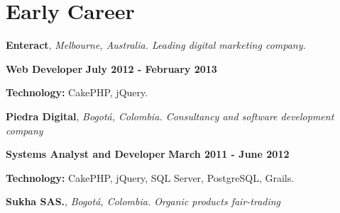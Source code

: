 
\section{Early Career}
%
\textbf{Enteract},
\textit{Melbourne, Australia. Leading digital marketing company.}

\begin{outerlist}
\item[\FA \faAngleDoubleRight] \textbf{Web Developer} \hfill
\textbf{July 2012 - February 2013}
\end{outerlist}
% 
    \begin{innerlist}
\item \textbf{Technology:} CakePHP, jQuery.
    \end{innerlist}

\quarterblankline

\textbf{Piedra Digital},
\textit{Bogot\'a, Colombia. Consultancy and software development
company}

\begin{outerlist}
\item[\FA \faAngleDoubleRight] \textbf{Systems Analyst and Developer} \hfill
\textbf{March 2011 - June 2012}
\end{outerlist}
% 
    \begin{innerlist}
\item \textbf{Technology:} CakePHP, jQuery, SQL Server, PostgreSQL, Grails.
    \end{innerlist}

\quarterblankline

\textbf{Sukha SAS.}, \textit{Bogot\'a, Colombia. Organic products fair-trading}

